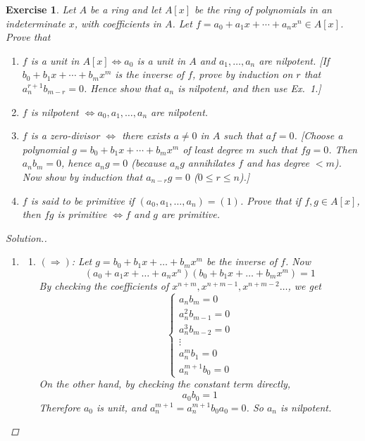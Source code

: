 \documentclass{article}
\theoremstyle{breakstyle}
\newtheorem{exercise}{Exercise}
\newenvironment{solution}
  {\begin{proof}[Solution.]\renewcommand{\qedsymbol}{}}
  {\end{proof}}
\begin{document}
\begin{exercise}
Let \(A\) be a ring and let \(A[x]\) be the ring of polynomials in an indeterminate \(x\), with coefficients in \(A\). Let \(f=a_0+a_1x+\cdots+a_nx^n\in A[x]\). Prove that
\begin{enumerate}[label=(\roman*)]
    \item \(f\) is a unit in \(A[x]\Leftrightarrow a_0\) is a unit in \(A\) and \(a_1,\ldots,a_n\) are nilpotent. [If \(b_0+b_1x+\cdots+b_mx^m\) is the inverse of \(f\), prove by induction on \(r\) that \(a_n^{r+1}b_{m-r}=0\). Hence show that \(a_n\) is nilpotent, and then use Ex.~1.]
    \item \(f\) is nilpotent \(\Leftrightarrow a_0,a_1,\ldots,a_n\) are nilpotent.
    \item \(f\) is a zero-divisor \(\Leftrightarrow\) there exists \(a\neq0\) in \(A\) such that \(af=0\). [Choose a polynomial \(g=b_0+b_1x+\cdots+b_mx^m\) of least degree \(m\) such that \(fg=0\). Then \(a_nb_m=0\), hence \(a_ng=0\) (because \(a_ng\) annihilates \(f\) and has degree \(<m\)). Now show by induction that \(a_{n-r}g=0\) (\(0\le r\le n\)).]
    \item \(f\) is said to be primitive if \((a_0,a_1,\ldots,a_n)=(1)\). Prove that if \(f,g\in A[x]\), then \(fg\) is primitive \(\Leftrightarrow f\) and \(g\) are primitive.
\end{enumerate}

\begin{solution}
    \begin{enumerate}[label=({\roman*})]
            \item 
                \begin{enumerate}[label=({\alph*})]
                    \item $(\Rightarrow)$:
                        Let $g=b_0+b_1x+\ldots +b_{m}x^{m}$ be the inverse of $f$.
                        Now
                        $$
                        (a_0+a_1x+\ldots +a_{n}x^{n})(b_0+b_1x+\ldots +b_{m}x^{m})=1
                        $$
                        By checking the coefficients of $x^{n+m},x^{n+m-1},x^{n+m-2}\ldots $, we get
                        $$
                        \begin{cases}
                            a_{n}b_{m}=0\\
                            a_{n}^2b_{m-1}=0\\
                            a_{n}^3b_{m-2}=0\\
                            \vdots\\
                            a_{n}^{m}b_1=0\\
                            a_{n}^{m+1}b_0=0
                        \end{cases}
                        $$
                        On the other hand, by checking the constant term directly,
                         $$
                        a_0b_0=1
                        $$
                        Therefore $a_0$ is unit, and $a_{n}^{m+1}=a_{n}^{m+1}b_0a_0=0$.
                        So $a_{n}$ is nilpotent.


\end{enumerate}
\end{enumerate}
\end{solution}
\end{exercise}
\end{document}
